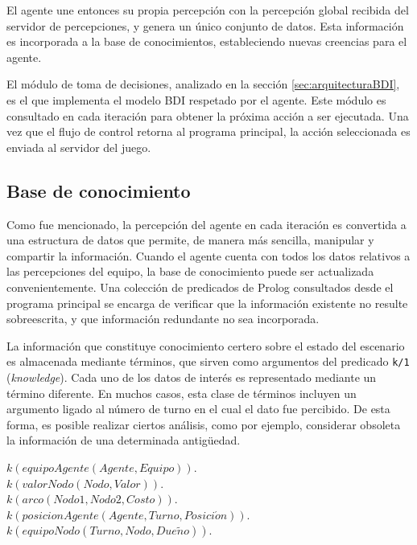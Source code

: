\documentclass[oneside]{book}
\theoremstyle{definition}
\theoremstyle{example}
\newcommand{\lit}[1]{\mbox{$ #1$}}
\begin{document}
El agente une entonces su propia percepción con la percepción global recibida del servidor 
de percepciones, y genera un único conjunto de datos. Esta información es incorporada a la 
base de conocimientos, estableciendo nuevas creencias para el agente.

El módulo de toma de decisiones, analizado en la sección \ref{sec:arquitecturaBDI}, es el 
que implementa el modelo BDI respetado por el agente. Este módulo es consultado en cada 
iteración para obtener la próxima acción a ser ejecutada. Una vez que el flujo de control 
retorna al programa principal, la acción seleccionada es enviada al servidor del juego.

\subsection{Base de conocimiento}


Como fue mencionado, la percepción del agente en cada iteración es convertida a una 
estructura de datos que permite, de manera más sencilla, manipular y compartir la 
información. Cuando el agente cuenta con todos los datos relativos a las percepciones 
del equipo, la base de conocimiento puede ser actualizada convenientemente. Una colección 
de predicados de Prolog consultados desde el programa principal se encarga de verificar 
que la información existente no resulte sobreescrita, y que información redundante no sea 
incorporada. 

La información que constituye conocimiento certero sobre el estado del escenario es 
almacenada mediante términos, que sirven como argumentos del predicado \texttt{k/1} 
(\textit{knowledge}). Cada uno de los datos de interés es representado mediante un 
término diferente. 
En muchos casos, esta clase de términos incluyen un argumento ligado al número de turno 
en el cual el dato fue percibido. De esta forma, es posible realizar ciertos análisis, 
como por ejemplo, considerar obsoleta la información de una determinada antigüedad.

\vspace*{1em}
\noindent\lit{k(equipoAgente(Agente, Equipo)).}\\
\lit{k(valorNodo(Nodo, Valor)).}\\
\lit{k(arco(Nodo1, Nodo2, Costo)).}\\
\lit{k(posicionAgente(Agente, Turno, Posici\acute{o}n)).}\\
\lit{k(equipoNodo(Turno, Nodo, Due\tilde{n}o)).}\\
\end{document}
